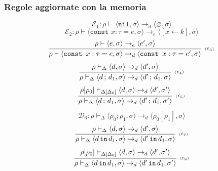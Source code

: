 \documentclass[oneside,a4paper,11pt]{book}
\theoremstyle{italicstyle}
\theoremstyle{normStyle}
\begin{document}
\subsubsection{Regole aggiornate con la memoria}
\[
  \mathcal{E}_1: \rho \vdash\, \langle \texttt{nil}, \sigma \rangle \rightarrow_d \langle \varnothing, \sigma \rangle
\]
\[
  \mathcal{E}_2: \rho \vdash \langle \texttt{const }x:\tau=e,\sigma\rangle \rightarrow_e  \langle [x \leftarrow k], \sigma \rangle
\]
\[
    \infer[\scriptscriptstyle (\mathcal{E}_3)]
    {
      \rho \vdash \langle \texttt{const }x:\tau=e,\sigma \rangle \rightarrow_d \langle \texttt{const }x:\tau=e',\sigma \rangle
    }
    {
      \rho \vdash \langle e , \sigma \rangle \rightarrow_e \langle e', \sigma \rangle
    }
\]
\[
    \infer[\scriptscriptstyle (\mathcal{E}_4)]
    {
      \rho \vdash_\Delta  \langle d\,; \,d_1, \sigma \rangle \rightarrow_d \langle d'\,; \,d_1, \sigma \rangle
    }
    {
      \rho \vdash_\Delta \langle d , \sigma \rangle \rightarrow_d \langle d', \sigma \rangle
    }
\]
\[
    \infer[\scriptscriptstyle (\mathcal{E}_5)]
    {
      \rho \vdash_\Delta  \langle d\,; \,d_1, \sigma \rangle \rightarrow_d \langle d'\,; \,d_1, \sigma' \rangle
    }
    {
      \rho[\rho_0] \vdash_{\Delta[\Delta_0]} \langle d , \sigma \rangle \rightarrow_d \langle d', \sigma' \rangle
    }
\]
\[
    \mathcal{D}_6: \rho\vdash_\Delta \langle \rho_0;\rho_1,\sigma\rangle \rightarrow_d \langle\rho_0[\rho_1],\sigma\rangle
\]
\[
    \infer[\scriptscriptstyle (\mathcal{E}_7)]
    {
      \rho \vdash_\Delta  \langle d\,\texttt{in} \,d_1, \sigma \rangle \rightarrow_d \langle d'\,\texttt{in} \,d_1, \sigma \rangle
    }
    {
      \rho \vdash_\Delta \langle d , \sigma \rangle \rightarrow_d \langle d', \sigma \rangle
    }
\]
\[
    \infer[\scriptscriptstyle (\mathcal{E}_8)]
    {
      \rho \vdash_\Delta  \langle d\,\texttt{in} \,d_1, \sigma \rangle \rightarrow_d \langle d'\,\texttt{in} \,d_1, \sigma' \rangle
    }
    {
      \rho[\rho_0] \vdash_{\Delta[\Delta_0]} \langle d , \sigma \rangle \rightarrow_d \langle d', \sigma' \rangle
    }
\]
\end{document}

